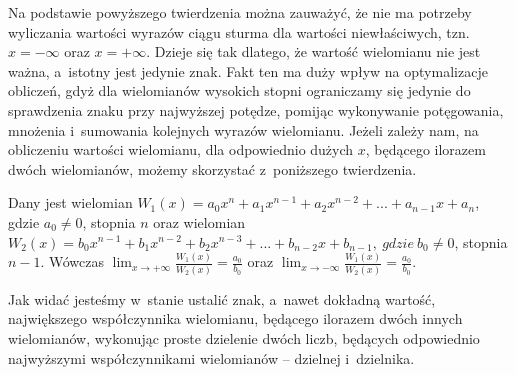 Na podstawie powyższego twierdzenia można zauważyć, że nie ma potrzeby wyliczania wartości wyrazów ciągu sturma dla wartości niewłaściwych, tzn. $x=-\infty$ oraz $x=+\infty.$ Dzieje się tak dlatego, że wartość wielomianu nie jest ważna, a~istotny jest jedynie znak. Fakt ten ma duży wpływ na optymalizacje obliczeń, gdyż dla wielomianów wysokich stopni ograniczamy się jedynie do sprawdzenia znaku przy najwyższej potędze, pomijąc wykonywanie potęgowania, mnożenia i~sumowania kolejnych wyrazów wielomianu.
Jeżeli zależy nam, na obliczeniu wartości wielomianu, dla odpowiednio dużych $x$, będącego ilorazem dwóch wielomianów, możemy skorzystać z~poniższego twierdzenia.

\begin{theorem}
	$ $ \\
	Dany jest wielomian $W_1(x) = a_0x^n + a_1x^{n-1} + a_2x^{n-2} + ... + a_{n-1}x + a_n$, gdzie $a_0 \ne 0$, stopnia $n$ oraz wielomian $W_2(x) = b_0x^{n-1} + b_1x^{n-2} + b_2x^{n-3} + ... + b_{n-2}x + b_{n-1},\ gdzie\ b_0 \ne 0$, stopnia $n-1$. Wówczas $\lim_{x \to +\infty}\frac{W_1(x)}{W_2(x)} = \frac{a_0}{b_0}$ oraz $\lim_{x \to -\infty}\frac{W_1(x)}{W_2(x)} = \frac{a_0}{b_0}.$
\end{theorem}

Jak widać jesteśmy w~stanie ustalić znak, a~nawet dokładną wartość, największego współczynnika wielomianu, będącego ilorazem dwóch innych wielomianów, wykonując proste dzielenie dwóch liczb, będących odpowiednio najwyższymi współczynnikami wielomianów -- dzielnej i~dzielnika.